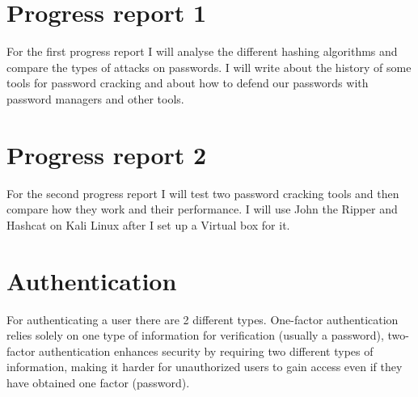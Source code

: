 \documentclass[10pt,oneside,english,a4paper]{article}
\begin{document}
\section{Progress report 1}
For the first progress report I will analyse the different hashing algorithms and compare the types of attacks on passwords. I will write about the history of some tools for password cracking and about how to defend our passwords with password managers and other tools. 

\section{Progress report 2}
For the second progress report I will test two password cracking tools and then compare how they work and their performance. I will use John the Ripper and Hashcat on Kali Linux after I set up a Virtual box for it.

\clearpage


\section{Authentication}
For authenticating a user there are 2 different types. One-factor authentication relies solely on one type of information for verification (usually a password), two-factor authentication enhances security by requiring two different types of information, making it harder for unauthorized users to gain access even if they have obtained one factor (password).
\end{document}
